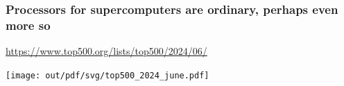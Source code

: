 \documentclass[12pt,dvipdfmx]{beamer}
\begin{document}
\begin{frame}
\frametitle{Processors for supercomputers are ordinary, perhaps even more so}
  \url{https://www.top500.org/lists/top500/2024/06/}
  \begin{center}
    \texttt{[image: out/pdf/svg/top500\_2024\_june.pdf]}
  \end{center}
\end{frame}

\end{document}
